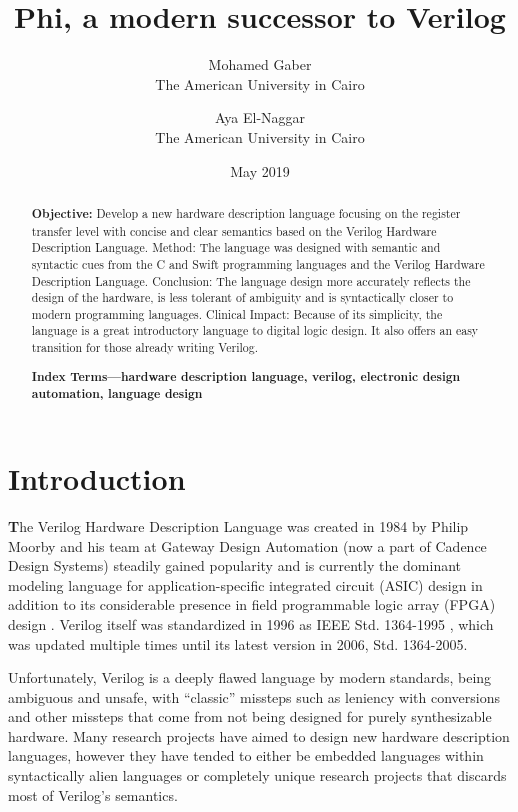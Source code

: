 \documentclass[10pt, two column]{article}
\title{\huge Phi, a modern successor to Verilog}
\author{Mohamed Gaber\\ The American University in Cairo \and Aya El-Naggar\\ The American University in Cairo}
\date{May 2019}
\theoremstyle{definition}
\begin{document}
\onecolumn
\maketitle
\begin{abstract}
\textbf{Objective:} Develop a new hardware description language focusing on the register transfer level with concise and clear semantics based on the Verilog Hardware Description Language. Method: The language was designed with semantic and syntactic cues from the C and Swift programming languages and the Verilog Hardware Description Language. Conclusion: The language design more accurately reflects the design of the hardware, is less tolerant of ambiguity and is syntactically closer to modern programming languages. Clinical Impact: Because of its simplicity, the language is a great introductory language to digital logic design. It also offers an easy transition for those already writing Verilog.
     
\textbf{Index Terms—hardware description language, verilog, electronic design automation, language design}

\end{abstract}

\tableofcontents

\twocolumn

\section{Introduction}
{\huge\textbf T}he Verilog Hardware Description Language was created in 1984 by Philip Moorby and his team at Gateway Design Automation (now a part of Cadence Design Systems) \cite{threeDecadesofHDL} steadily gained popularity and is currently the dominant modeling language for application-specific integrated circuit (ASIC) design in addition to its considerable presence in field programmable logic array (FPGA) design \cite{foster_2016}. Verilog itself was standardized in 1996 as IEEE Std. 1364-1995 \cite{IEEEstandardHDLbasedonVer_1996}, which was updated multiple times until its latest version in 2006, Std. 1364-2005\cite{IEEEstandardforVerilogHDL_2006}. 
\par

Unfortunately, Verilog is a deeply flawed language by modern standards, being ambiguous and unsafe, with “classic” missteps such as leniency with conversions and other missteps that come from not being designed for purely synthesizable hardware. Many research projects have aimed to design new hardware description languages, however they have tended to either be embedded languages within syntactically alien languages or completely unique research projects that discards most of Verilog’s semantics.\par
\end{document}
